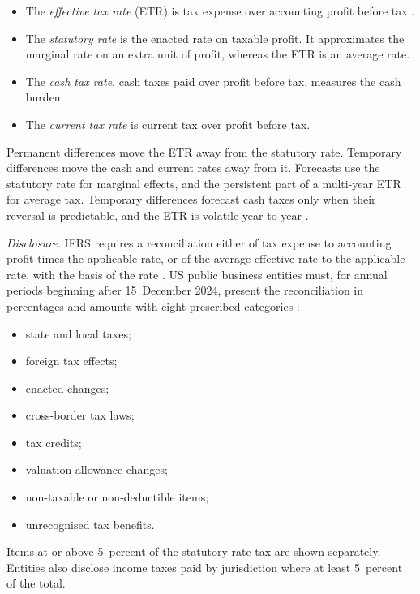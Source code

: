 \begin{qfmethod}\label{meth:tax-rate-measures}
\begin{itemize}
\item The \emph{effective tax rate} (ETR) is tax expense over accounting profit before tax \citep[IAS~12 para.~86]{eu-2023-1803-ias12}.
\item The \emph{statutory rate} is the enacted rate on taxable profit. It approximates the marginal rate on an extra unit of profit, whereas the ETR is an average rate.
\item The \emph{cash tax rate}, cash taxes paid over profit before tax, measures the cash burden.
\item The \emph{current tax rate} is current tax over profit before tax.
\end{itemize}
Permanent differences move the ETR away from the statutory rate. Temporary differences move the cash and current rates away from it. Forecasts use the statutory rate for marginal effects, and the persistent part of a multi-year ETR for average tax. Temporary differences forecast cash taxes only when their reversal is predictable, and the ETR is volatile year to year \citep[p.~373]{financial-statement-analysis-2009}.

\emph{Disclosure.} IFRS requires a reconciliation either of tax expense to accounting profit times the applicable rate, or of the average effective rate to the applicable rate, with the basis of the rate \citep[IAS~12 para.~81(c)]{eu-2023-1803-ias12}. US public business entities must, for annual periods beginning after 15~December 2024, present the reconciliation in percentages and amounts with eight prescribed categories \citep[pp.~2--5]{us-tax-disclosures-2023}:
\begin{itemize}
\item state and local taxes;
\item foreign tax effects;
\item enacted changes;
\item cross-border tax laws;
\item tax credits;
\item valuation allowance changes;
\item non-taxable or non-deductible items;
\item unrecognised tax benefits.
\end{itemize}
Items at or above 5~percent of the statutory-rate tax are shown separately. Entities also disclose income taxes paid by jurisdiction where at least 5~percent of the total.


\end{qfmethod}
